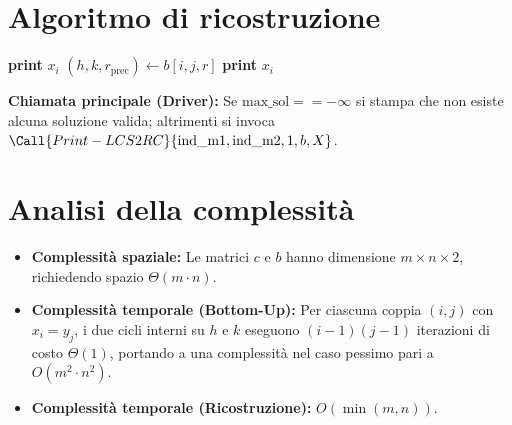 \section{Algoritmo di ricostruzione}
\begin{algorithm}[htbp]
\caption{Ricostruzione per LCS con 2 elementi rossi consecutivi}
\begin{algorithmic}[1]
        \State \textbf{print} $x_i$
        \State \Return
    \Else
        \State $(h, k, r_{\text{prec}}) \gets b[i, j, r]$
        \State {}
        \State \textbf{print} $x_i$
    \EndIf
\EndProcedure
\end{algorithmic}
\end{algorithm}

\noindent
\textbf{Chiamata principale (Driver):} Se $\text{max\_sol} == -\infty$ si stampa che non esiste alcuna soluzione valida; altrimenti si invoca $\Call{Print-LCS2RC}{\text{ind\_m1}, \text{ind\_m2}, 1, b, X}$.

\section{Analisi della complessità}
\begin{itemize}
    \item \textbf{Complessità spaziale:} Le matrici $c$ e $b$ hanno dimensione $m \times n \times 2$, richiedendo spazio $\Theta(m \cdot n)$.
    \item \textbf{Complessità temporale (Bottom-Up):} Per ciascuna coppia $(i, j)$ con $x_i = y_j$, i due cicli interni su $h$ e $k$ eseguono $(i-1)(j-1)$ iterazioni di costo $\Theta(1)$, portando a una complessità nel caso pessimo pari a $O(m^2 \cdot n^2)$.
    \item \textbf{Complessità temporale (Ricostruzione):} $O(\min(m, n))$.
\end{itemize}